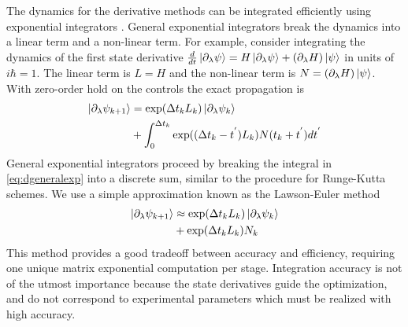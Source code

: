 The dynamics for the derivative methods can be integrated efficiently using exponential integrators
\cite{berland2005solving, einkemmer2017performance}.
General exponential integrators break the dynamics into a linear term and a non-linear term. For example, consider
integrating the dynamics of the first state derivative $\frac{d}{dt} \ket{\partial_{\lambda} \psi} =
H \ket{\partial_{\lambda} \psi} + (\partial_{\lambda} H) \ket{\psi}$ in units of $i\hbar = 1$.
The linear term is $L = H$ and the non-linear term is $N = (\partial_{\lambda} H) \ket{\psi}$.
With zero-order hold on the controls the exact propagation is
\begin{equation}
  \label{eq:dgeneralexp}
  \begin{aligned}
    \ket{\partial_{\lambda} \psi_{k + 1}} &= \exp(\Delta t_{k} L_{k}) \ket{\partial_{\lambda} \psi_{k}}\\
    &+ \int_{0}^{\Delta t_{k}} \exp((\Delta t_{k} - t^{'})L_{k}) N(t_{k} + t^{'}) dt^{'}\\
  \end{aligned}
\end{equation}
General exponential integrators proceed by breaking the integral in \eqref{eq:dgeneralexp}
into a discrete sum, similar to the procedure
for Runge-Kutta schemes. We use a simple approximation known as the Lawson-Euler
method \cite{berland2005solving}
\begin{equation}
  \begin{aligned}
    \ket{\partial_{\lambda} \psi_{k + 1}} &\approx \exp(\Delta t_{k}L_{k}) \ket{\partial_{\lambda} \psi_{k}}\\
    &+ \exp(\Delta t_{k}L_{k}) N_{k}\\
  \end{aligned}
\end{equation}
This method provides a good tradeoff between accuracy and efficiency, requiring one unique matrix
exponential computation per stage. Integration accuracy is not of the utmost importance because the
state derivatives guide the optimization, and do not correspond to experimental parameters
which must be realized with high accuracy.




